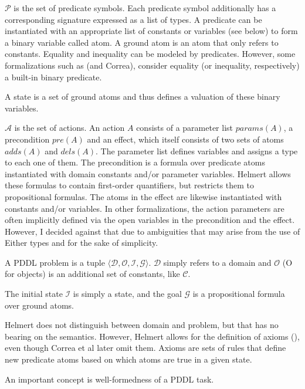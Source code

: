$\mathcal P$ is the set of predicate symbols. Each predicate symbol additionally has a corresponding signature expressed as a list of types. A predicate can be instantiated with an appropriate list of constants or variables (see below) to form a binary variable called atom. A ground atom is an atom that only refers to constants.
Equality and inequality can be modeled by predicates. However, some formalizations such as \cite{AbLa} (and Correa), consider equality (or inequality, respectively) a built-in binary predicate.

A state is a set of ground atoms and thus defines a valuation of these binary variables.

$\mathcal A$ is the set of actions. An action $A$ consists of a parameter list $\mathit{params}(A)$, a precondition $\mathit{pre}(A)$ and an effect, which itself consists of two sets of atoms $\mathit{adds}(A)$ and $\mathit{dels}(A)$.
The parameter list defines variables and assigns a type to each one of them.
The precondition is a formula over predicate atoms instantiated with domain constants and/or parameter variables.
Helmert allows these formulas to contain first-order quantifiers, but \cite{AbLa} restricts them to propositional formulas.
The atoms in the effect are likewise instantiated with constants and/or variables.
In other formalizations, the action parameters are often implicitly defined via the open variables in the precondition and the effect. However, I decided against that due to ambiguities that may arise from the use of Either types and for the sake of simplicity.

A PDDL problem is a tuple $\langle\mathcal D, \mathcal O, \mathcal I, \mathcal G\rangle$. $\mathcal D$ simply refers to a domain and $\mathcal O$ (O for objects) is an additional set of constants, like $\mathcal C$.

The initial state $\mathcal I$ is simply a state, and the goal $\mathcal G$ is a propositional formula over ground atoms.

Helmert does not distinguish between domain and problem, but that has no bearing on the semantics.
However, Helmert allows for the definition of axioms (), even though Correa et al later omit them. Axioms are sets of rules that define new predicate atoms based on which atoms are true in a given state.

An important concept is well-formedness of a PDDL task.

